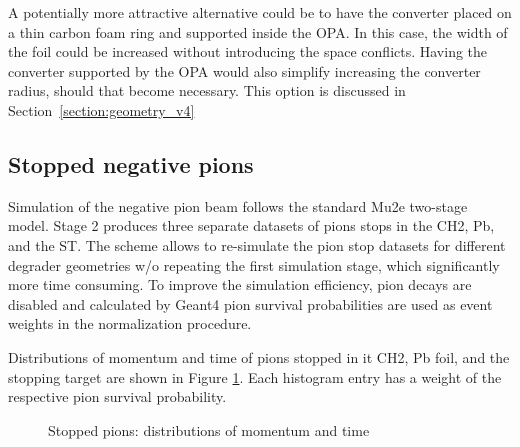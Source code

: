 A potentially more attractive alternative could be to have the converter placed
on a thin carbon foam ring and supported inside the OPA. In this case,
the width of the foil could be increased without introducing the space conflicts.
Having the converter supported by the OPA would also simplify increasing
the converter radius, should that become necessary.
%
This option is discussed in Section~\ref{section:geometry_v4}


\newpage
\subsection{Stopped negative pions}

Simulation of the negative pion beam follows the standard Mu2e two-stage model.
Stage 2 produces three separate datasets of pions stops in the CH2, Pb, and the ST.
The scheme allows to re-simulate the pion stop datasets for different degrader geometries
w/o repeating the first simulation stage, which significantly more time consuming.
To improve the simulation efficiency, pion decays are disabled and calculated by Geant4
pion survival probabilities are used as event weights in the normalization procedure.

Distributions of momentum and time of pions stopped in it CH2, Pb foil, and the
stopping target are shown in Figure \ref{figure:stopped_pim_mom_time}.
Each histogram entry has a weight of the respective pion survival probability.

\begin{figure}[H]
  \caption{
    \label{figure:stopped_pim_mom_time}
    Stopped pions: distributions of momentum and time
  }
\end{figure}

